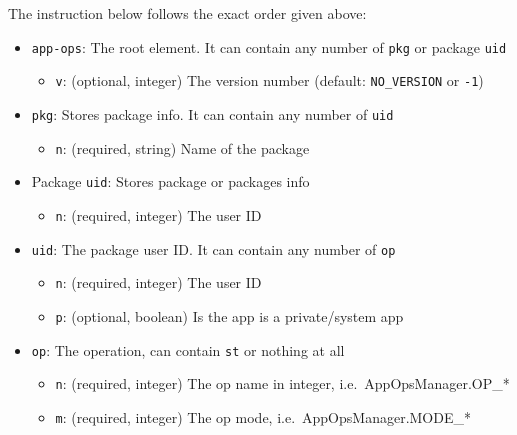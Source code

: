 The instruction below follows the exact order given above:
\begin{itemize}
    \item \texttt{app-ops}: The root element. It can contain any number of \texttt{pkg} or package \texttt{uid}
    \begin{itemize}
        \item \texttt{v}: (optional, integer) The version number (default: \texttt{NO\_VERSION} or \texttt{-1})
    \end{itemize}

    \item \texttt{pkg}: Stores package info. It can contain any number of \texttt{uid}
    \begin{itemize}
        \item \texttt{n}: (required, string) Name of the package
    \end{itemize}

    \item Package \texttt{uid}: Stores package or packages info
    \begin{itemize}
        \item \texttt{n}: (required, integer) The user ID
    \end{itemize}

    \item \texttt{uid}: The package user ID. It can contain any number of \texttt{op}
    \begin{itemize}
        \item \texttt{n}: (required, integer) The user ID
        \item \texttt{p}: (optional, boolean) Is the app is a private/system app
    \end{itemize}

    \item \texttt{op}: The operation, can contain \texttt{st} or nothing at all
    \begin{itemize}
        \item \texttt{n}: (required, integer) The op name in integer, i.e.\ AppOpsManager.OP\_*
        \item \texttt{m}: (required, integer) The op mode, i.e.\ AppOpsManager.MODE\_*
    \end{itemize}


\end{itemize}
